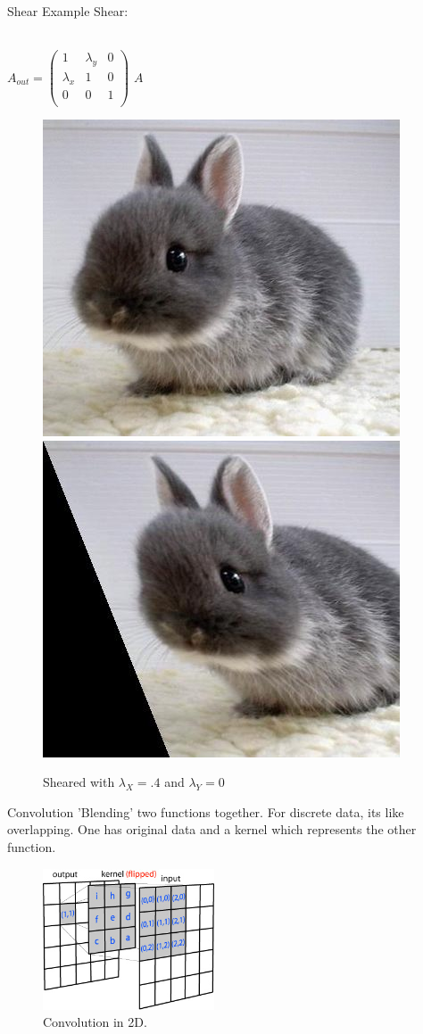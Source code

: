 \documentclass{beamer}
\begin{document}
\begin{frame}{Shear}
Example Shear:

\hspace{0.1 in}
\\
$A_{out} = \begin{pmatrix}
	1 & \lambda_y & 0\\
	\lambda_x & 1 & 0\\
	0 & 0 & 1\\
\end{pmatrix}$
$A$
\\
\begin{figure}

\includegraphics[width = 1.1 in]{bunnycute.jpg}
\hspace{0.5 in}
\includegraphics[width = 1.1 in]{bunnycuteShear.jpg}
\caption{Sheared with $\lambda_X = .4$ and $\lambda_Y = 0$}
\end{figure}

\end{frame}




\begin{frame}{Convolution}
'Blending' two functions together. For discrete data, its like overlapping.
One has original data and a kernel which represents the other function. 
\begin{figure}[htp]
\centering
\includegraphics[width=2in]{conv2d_matrix.jpg}
\caption{Convolution in 2D.}
\label{}
\end{figure}
\end{frame}
\end{document}
